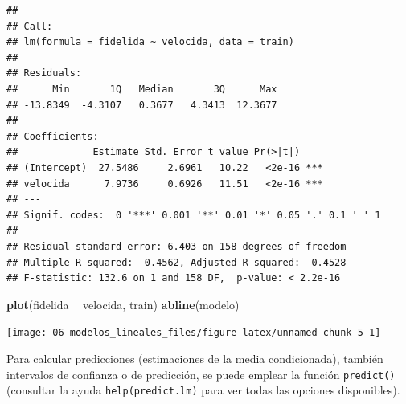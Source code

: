 \documentclass[
]{book}
\newenvironment{Shaded}{\begin{snugshade}}{\end{snugshade}}
\newcommand{\KeywordTok}[1]{\textcolor[rgb]{0.13,0.29,0.53}{\textbf{#1}}}
\newcommand{\NormalTok}[1]{#1}
\newcommand{\OperatorTok}[1]{\textcolor[rgb]{0.81,0.36,0.00}{\textbf{#1}}}
\newcommand{\StringTok}[1]{\textcolor[rgb]{0.31,0.60,0.02}{#1}}
\theoremstyle{break}
\theoremstyle{definition}
\theoremstyle{definition}
\theoremstyle{definition}
\theoremstyle{remark}
\begin{document}
\begin{verbatim}
## 
## Call:
## lm(formula = fidelida ~ velocida, data = train)
## 
## Residuals:
##      Min       1Q   Median       3Q      Max 
## -13.8349  -4.3107   0.3677   4.3413  12.3677 
## 
## Coefficients:
##             Estimate Std. Error t value Pr(>|t|)    
## (Intercept)  27.5486     2.6961   10.22   <2e-16 ***
## velocida      7.9736     0.6926   11.51   <2e-16 ***
## ---
## Signif. codes:  0 '***' 0.001 '**' 0.01 '*' 0.05 '.' 0.1 ' ' 1
## 
## Residual standard error: 6.403 on 158 degrees of freedom
## Multiple R-squared:  0.4562, Adjusted R-squared:  0.4528 
## F-statistic: 132.6 on 1 and 158 DF,  p-value: < 2.2e-16
\end{verbatim}

\begin{Shaded}
\begin{Highlighting}[]
\KeywordTok{plot}\NormalTok{(fidelida }\OperatorTok{~}\StringTok{ }\NormalTok{velocida, train)}
\KeywordTok{abline}\NormalTok{(modelo)}
\end{Highlighting}
\end{Shaded}

\begin{center}\texttt{[image: 06-modelos\_lineales\_files/figure-latex/unnamed-chunk-5-1]} \end{center}

Para calcular predicciones (estimaciones de la media condicionada), también intervalos de confianza o de predicción, se puede emplear la función \texttt{predict()} (consultar la ayuda \texttt{help(predict.lm)} para ver todas las opciones disponibles).
\end{document}
